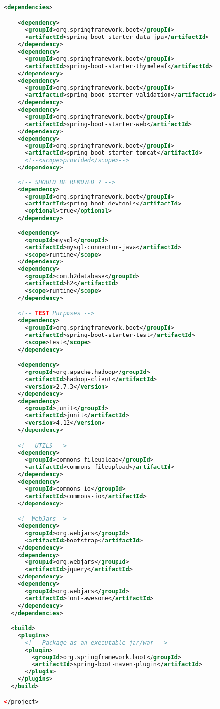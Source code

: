 \begin{lstlisting}[language=xml,basicstyle=\tiny,caption=pom.xml]
  <dependencies>

    <dependency>
      <groupId>org.springframework.boot</groupId>
      <artifactId>spring-boot-starter-data-jpa</artifactId>
    </dependency>
    <dependency>
      <groupId>org.springframework.boot</groupId>
      <artifactId>spring-boot-starter-thymeleaf</artifactId>
    </dependency>
    <dependency>
      <groupId>org.springframework.boot</groupId>
      <artifactId>spring-boot-starter-validation</artifactId>
    </dependency>
    <dependency>
      <groupId>org.springframework.boot</groupId>
      <artifactId>spring-boot-starter-web</artifactId>
    </dependency>
    <dependency>
      <groupId>org.springframework.boot</groupId>
      <artifactId>spring-boot-starter-tomcat</artifactId>
      <!--<scope>provided</scope>-->
    </dependency>
    
    <!-- SHOULD BE REMOVED ? -->
    <dependency>
      <groupId>org.springframework.boot</groupId>
      <artifactId>spring-boot-devtools</artifactId>
      <optional>true</optional>
    </dependency>
    
    <dependency>
      <groupId>mysql</groupId>
      <artifactId>mysql-connector-java</artifactId>
      <scope>runtime</scope>
    </dependency>
    <dependency>
      <groupId>com.h2database</groupId>
      <artifactId>h2</artifactId>
      <scope>runtime</scope>
    </dependency>

    <!-- TEST Purposes -->
    <dependency>
      <groupId>org.springframework.boot</groupId>
      <artifactId>spring-boot-starter-test</artifactId>
      <scope>test</scope>
    </dependency>

    <dependency>
      <groupId>org.apache.hadoop</groupId>
      <artifactId>hadoop-client</artifactId>
      <version>2.7.3</version>
    </dependency>
    <dependency>
      <groupId>junit</groupId>
      <artifactId>junit</artifactId>
      <version>4.12</version>
    </dependency>

    <!-- UTILS -->
    <dependency>
      <groupId>commons-fileupload</groupId>
      <artifactId>commons-fileupload</artifactId>
    </dependency>
    <dependency>
      <groupId>commons-io</groupId>
      <artifactId>commons-io</artifactId>
    </dependency>

    <!--WebJars-->
    <dependency>
      <groupId>org.webjars</groupId>
      <artifactId>bootstrap</artifactId>
    </dependency>
    <dependency>
      <groupId>org.webjars</groupId>
      <artifactId>jquery</artifactId>
    </dependency>
    <dependency>
      <groupId>org.webjars</groupId>
      <artifactId>font-awesome</artifactId>
    </dependency>
  </dependencies>

  <build>
    <plugins>
      <!-- Package as an executable jar/war -->
      <plugin>
        <groupId>org.springframework.boot</groupId>
        <artifactId>spring-boot-maven-plugin</artifactId>
      </plugin>
    </plugins>
  </build>

</project>
\end{lstlisting}
